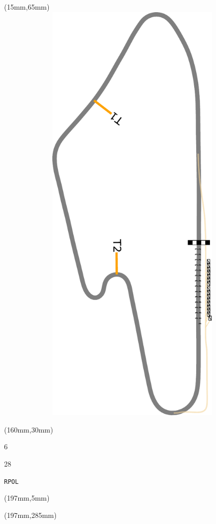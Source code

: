\begin{textblock*}{185mm}(15mm,65mm)%
\centering
\mbox{\includegraphics[width=185mm,height=210mm,keepaspectratio]{PT/RPOL.pdf}}
\end{textblock*}
\begin{textblock*}{40mm}(160mm,30mm)%
\Large
\par{} 
\par6 
\par28 
\par\hfill\tiny\tt RPOL\\
\end{textblock*}
\begin{textblock*}{20mm}(197mm,5mm)%
\fbox{\thepage}
\label{RPOL}
\end{textblock*}
\begin{textblock*}{20mm}(197mm,285mm)%
\fbox{\thepage}
\end{textblock*}

